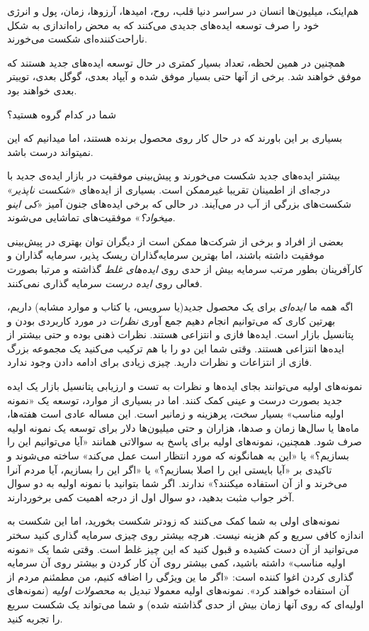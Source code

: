 هم‌اینک، میلیون‌ها انسان در سراسر دنیا قلب، روح، امیدها، آرزوها، زمان،
پول و انرژی خود را صرف توسعه ایده‌های جدیدی می‌کنند که به محض راه‌اندازی
به شکل ناراحت‌کننده‌ای شکست می‌خورند.

همچنین در همین لحظه، تعداد بسیار کمتری در حال توسعه ایده‌های جدید هستند
که موفق خواهند شد. برخی از آنها حتی بسیار موفق شده و آیپاد بعدی، گوگل
بعدی، توییتر بعدی خواهند بود.

شما در کدام گروه هستید؟

بسیاری بر این باورند که در حال کار روی محصول برنده هستند، اما میدانیم که
این نمیتواند درست باشد.

بیشتر ایده‌های جدید شکست می‌خورند و پیش‌بینی موفقیت در بازار ایده‌ی جدید
با درجه‌ای از اطمینان تقریبا غیرممکن است. بسیاری از ایده‌های «\emph{شکست
ناپذیر}» شکست‌های بزرگی از آب در می‌آیند. در حالی که برخی ایده‌های جنون
آمیز «\emph{کی اینو میخواد؟}» موفقیت‌های تماشایی می‌شوند.

بعضی از افراد و برخی از شرکت‌ها ممکن است از دیگران توان بهتری در
پیش‌بینی موفقیت داشته باشند، اما بهترین سرمایه‌گذاران ریسک پذیر، سرمایه
گذاران و کارآفرینان بطور مرتب سرمایه بیش از حدی روی \emph{ایده‌های غلط}
گذاشته و مرتبا بصورت فعالی روی \emph{ایده درست} سرمایه گذاری نمی‌کنند.

اگه همه ما \emph{ایده‌ای} برای یک محصول جدید(یا سرویس، یا کتاب و موارد
مشابه) داریم، بهرتین کاری که می‌توانیم انجام دهیم جمع آوری \emph{نظرات}
در مورد کاربردی بودن و پتانسیل بازار است. ایده‌ها فازی و انتزاعی هستند.
نظرات ذهنی بوده و حتی بیشتر از ایده‌ها انتزاعی هستند. وقتی شما این دو را
با هم ترکیب می‌کنید یک مجموعه بزرگ فازی از انتزاعات و نظرات دارید. چیزی
زیادی برای ادامه دادن وجود ندارد.

نمونه‌های اولیه می‌توانند بجای ایده‌ها و نظرات به تست و ارزیابی پتانسیل
بازار یک ایده جدید بصورت درست و عینی کمک کنند. اما در بسیاری از موارد،
توسعه یک «نمونه اولیه مناسب» بسیار سخت، پرهزینه و زمانبر است. این مساله
عادی است هفته‌ها، ماه‌ها یا سال‌ها زمان و صدها، هزاران و حتی میلیون‌ها
دلار برای توسعه یک نمونه اولیه صرف شود. همچنین، نمونه‌های اولیه برای
پاسخ به سوالاتی همانند «آیا می‌توانیم این را بسازیم؟» یا «این به
همانگونه که مورد انتظار است عمل می‌کند» ساخته می‌شوند و تاکیدی بر «آیا
بایستی این را اصلا بسازیم؟» یا «اگر این را بسازیم، آیا مردم آنرا می‌خرند
و از آن استفاده میکنند؟» ندارند. اگر شما بتوانید با نمونه اولیه به دو
سوال آخر جواب مثبت بدهید، دو سوال اول از درجه اهمیت کمی برخوردارند.

نمونه‌های اولی به شما کمک می‌کنند که زودتر شکست بخورید، اما این شکست به
اندازه کافی سریع و کم هزینه نیست. هرچه بیشتر روی چیزی سرمایه گذاری کنید
سختر می‌توانید از آن دست کشیده و قبول کنید که این چیز غلط است. وقتی شما
یک «نمونه اولیه مناسب» داشته باشید، کمی بیشتر روی آن کار کردن و بیشتر
روی آن سرمایه گذاری کردن اغوا کننده است: «اگر ما ین ویژگی را اضافه کنیم،
من مطمئنم مردم از آن استفاده خواهند کرد». نمونه‌های اولیه معمولا تبدیل
به \emph{محصولات اولیه} (نمونه‌های اولیه‌ای که روی آنها زمان بیش از حدی
گذاشته شده) و شما می‌تواند یک شکست سریع را تجربه کنید.

